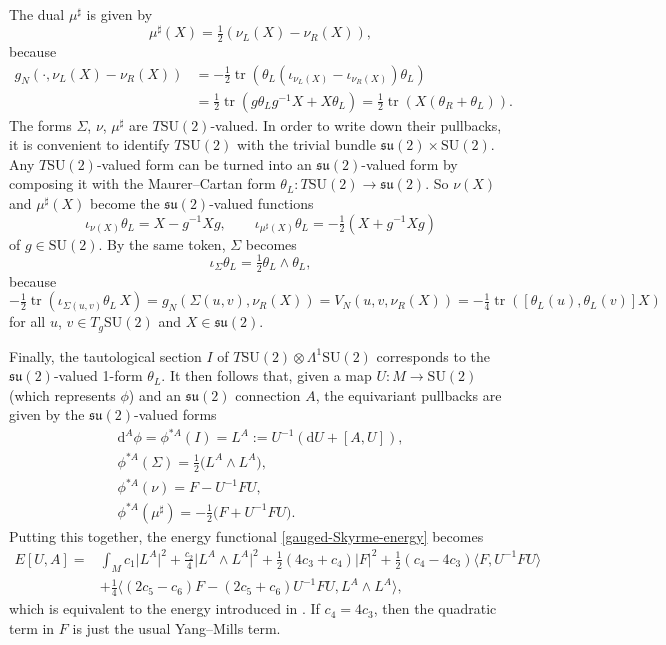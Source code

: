 \documentclass[10pt,a4paper]{amsart}
\newcommand{\su}{{\mathfrak{su}}}
\newcommand{\SU}{{\mathrm{SU}}}
\newcommand{\1}{{\mathbb{1}}}
\def \d{\mathrm{d}}
\newcommand{\tr}{{\operatorname{tr}}}
\numberwithin{equation}{section}
\begin{document}
The dual $\mu^\sharp$ is given by
\begin{equation}\label{moment-map-adjoint-round-sphere-choice}
\mu^\sharp(X)=\tfrac{1}{2}(\nu_L(X)-\nu_R(X)),
\end{equation}
because
\begin{align*}
 g_N(\cdot,\nu_L(X)-\nu_R(X))& =-\tfrac{1}{2}\tr(\theta_L(\iota_{\nu_L(X)}-\iota_{\nu_R(X)})\theta_L)\\
 & =\tfrac{1}{2}\tr(g\theta_Lg^{-1}X+X\theta_L)=\tfrac{1}{2}\tr(X(\theta_R+\theta_L)).
\end{align*}
The forms $\Sigma$, $\nu$, $\mu^\sharp$ are $T\SU(2)$-valued. In order to write down their pullbacks, it is convenient to identify $T\SU(2)$ with the trivial bundle $\su(2)\times \SU(2)$. Any $T\SU(2)$-valued form can be turned into an $\su(2)$-valued form by composing it with the Maurer--Cartan form $\theta_L\colon T\SU(2)\to\su(2)$. So $\nu(X)$ and $\mu^\sharp(X)$ become the $\su(2)$-valued functions
\begin{equation*}
\iota_{\nu(X)}\theta_L = X-g^{-1}Xg,\qquad \iota_{\mu^\sharp(X)}\theta_L = -\tfrac{1}{2}(X+g^{-1}Xg)
\end{equation*}
of $g\in\SU(2)$. By the same token, $\Sigma$ becomes
\begin{equation*}
\iota_\Sigma \theta_L=\tfrac{1}{2}\theta_L\wedge\theta_L,
\end{equation*}
because
\begin{equation*}
-\tfrac{1}{2}\tr(\iota_{\Sigma(u,v)}\theta_L\,X) = g_N(\Sigma(u,v),\nu_R(X)) = V_N(u,v,\nu_R(X)) = -\tfrac{1}{4}\tr([\theta_L(u),\theta_L(v)]X)
\end{equation*}
for all $u$, $v\in T_g\SU(2)$ and $X\in\su(2)$.

Finally, the tautological section $I$ of $T\SU(2)\otimes\Lambda^1\SU(2)$ corresponds to the $\su(2)$-valued \mbox{1-form} $\theta_L$. It then follows that, given a map $U\colon M\to \SU(2)$ (which represents $\phi$) and an $\su(2)$ connection $A$, the equivariant pullbacks are given by the $\su(2)$-valued forms
\begin{gather*}
\d^A\phi=\phi^{\ast A}(I)=L^A:=U^{-1}(\d U+[A,U]),\\
\phi^{\ast A}(\Sigma)=\tfrac{1}{2}\bigl(L^A\wedge L^A\bigr),\\
\phi^{\ast A}(\nu)=F-U^{-1}F U,\\
\phi^{\ast A}(\mu^\sharp) = -\tfrac{1}{2}\bigl(F+U^{-1}F U\bigr).
\end{gather*}
Putting this together, the energy functional \eqref{gauged-Skyrme-energy} becomes
\begin{align}\label{CHW-energu}
E[U,A]=&\int_Mc_1\big|L^A\big|^2+\tfrac{c_2}{4}\big|L^A\wedge L^A\big|^2+\tfrac{1}{2}(4c_3+c_4)|F|^2+\tfrac{1}{2}(c_4-4c_3)\big\langle F,U^{-1}FU\big\rangle\nonumber\\
&+\tfrac{1}{4}\big\langle (2c_5-c_6)F-(2c_5+c_6)U^{-1}F U,L^A\wedge L^A\big\rangle,
\end{align}
which is equivalent to the energy introduced in \cite{CorkHarlandWinyard2021gaugedskyrmelowbinding}. If $c_4=4c_3$, then the quadratic term in $F$ is just the usual Yang--Mills term.
\end{document}
